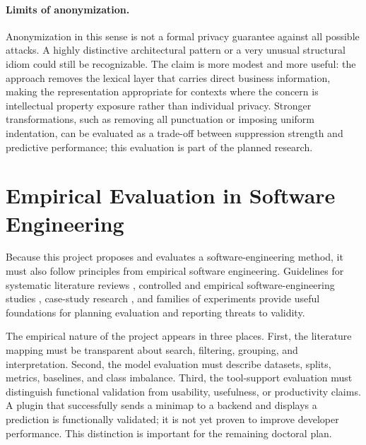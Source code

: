 \paragraph{Limits of anonymization.}
Anonymization in this sense is not a formal privacy guarantee against all
possible attacks. A highly distinctive architectural pattern or a very unusual
structural idiom could still be recognizable. The claim is more modest and more
useful: the approach removes the lexical layer that carries direct business
information, making the representation appropriate for contexts where the
concern is intellectual property exposure rather than individual privacy.
Stronger transformations, such as removing all punctuation or imposing uniform
indentation, can be evaluated as a trade-off between suppression strength and
predictive performance; this evaluation is part of the planned research.

\section{Empirical Evaluation in Software Engineering}

Because this project proposes and evaluates a software-engineering method, it
must also follow principles from empirical software engineering. Guidelines for
systematic literature reviews \cite{kitchenham2007slr}, controlled and empirical
software-engineering studies \cite{wohlin2012experimentation,kitchenham2002preliminary},
case-study research \cite{runeson2012case}, and families of experiments
\cite{basili1999families} provide useful foundations for planning evaluation and
reporting threats to validity.

The empirical nature of the project appears in three places. First, the
literature mapping must be transparent about search, filtering, grouping, and
interpretation. Second, the model evaluation must describe datasets, splits,
metrics, baselines, and class imbalance. Third, the tool-support evaluation must
distinguish functional validation from usability, usefulness, or productivity
claims. A plugin that successfully sends a minimap to a backend and displays a
prediction is functionally validated; it is not yet proven to improve developer
performance. This distinction is important for the remaining doctoral plan.
